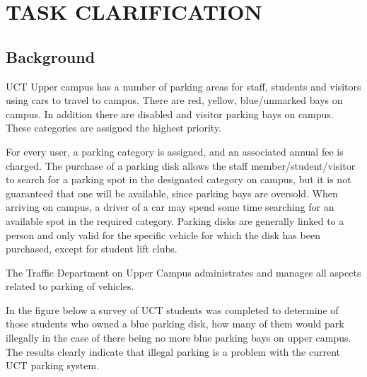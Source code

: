 
\newpage
\tableofcontents


\newcommand{\lsec}[1]{\normalsize{\textbf{#1}}\\}

\newpage

\section{TASK CLARIFICATION}
\subsection{Background}
UCT Upper campus has a number of parking areas for staff, students and visitors using cars to travel to campus. There are red, yellow, blue/unmarked bays on campus. In addition there are disabled and 
visitor parking bays on campus. These categories are assigned the highest priority. 

For every user, a parking category is assigned, and an associated annual fee is charged.  The purchase of a parking disk allows the staff member/student/visitor to search for a parking spot in the designated category on campus, but it is not guaranteed that one will be available, since parking bays are oversold. When arriving on campus, a driver of a car may spend some time searching for an available spot in the required category. Parking disks are generally linked to a person and only valid for the specific vehicle for which the disk has been purchased, except for student lift clubs.

The Traffic  Department  on  Upper  Campus  administrates  and  manages  all  aspects  related  to  parking  of vehicles.\cite{assignment}

In the figure below a survey of UCT students was completed to determine of those students who owned a blue parking disk, how many of them would park illegally in the case of there being no more blue parking bays on upper campus. The results clearly indicate that illegal parking is a problem with the current UCT parking system.

